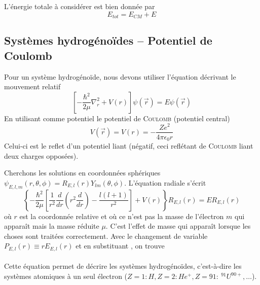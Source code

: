 L'énergie totale à considérer est bien donnée par
\begin{equation}
E_{tot} = E_{CM}+E
\end{equation}


\subsection{Systèmes hydrogénoïdes – Potentiel de Coulomb}
Pour un système hydrogénoïde, nous devons utiliser l'équation décrivant le mouvement relatif
\begin{equation}
\left[-\frac{\hbar^2}{2\mu}\nabla_r^2+V(r)\right]\psi(\vec{r}) = E\psi(\vec{r})
\end{equation}
En utilisant comme potentiel le potentiel de \textsc{Coulomb} (potentiel central)
\begin{equation}
V(\vec{r}) = V(r) = -\dfrac{Ze^2}{4\pi\epsilon_0r}
\end{equation}
Celui-ci est le reflet d'un potentiel liant (négatif, ceci reflétant de \textsc{Coulomb} liant deux charges
opposées).

Cherchons les solutions en coordonnées sphériques $\psi_{E,l,m}(r,\theta,\phi) = R_{E,l}(r)Y_{lm}(\theta,\phi)$. 
L'équation radiale s'écrit
\begin{equation}
\left\{-\frac{\hbar^2}{2\mu}\left[\frac{1}{r^2}\frac{d}{dr}\left(r^2\frac{d}{dr}\right) - \frac{l(l+1)}{r^2}\right]+
V(r)\right\}R_{E,l}(r) = ER_{E,l}(r)
\end{equation}
où $r$ est la coordonnée relative et où ce n'est pas la masse de l'électron $m$ qui apparaît mais la masse
réduite $\mu$. C'est l'effet de masse qui apparaît lorsque les choses sont traitées correctement. Avec le 
changement de variable $P_{E,l}(r) \equiv rE_{E,l}(r)$ et en substituant , on trouve\\

\ \\

Cette équation permet de décrire les systèmes hydrogénoïdes, c'est-à-dire les systèmes atomiques à un seul
électron ($Z=1 : H, Z=2 : He^+, Z=91 :\  ^{91}U^{90+}, \dots$).\\


